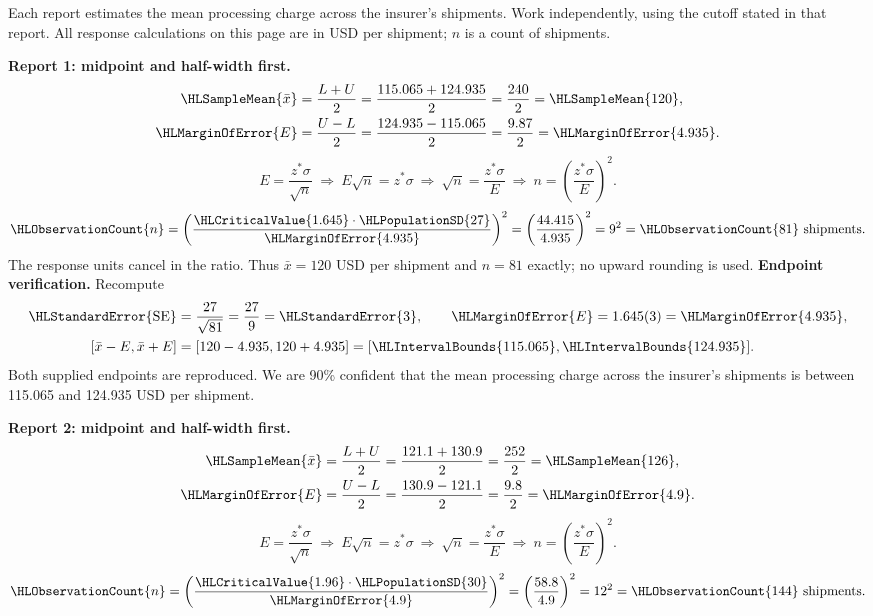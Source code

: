 Each report estimates the mean processing charge across the insurer's shipments. Work independently, using the cutoff stated in that report. All response calculations on this page are in USD per shipment; $n$ is a count of shipments.
\par\noindent\textbf{Report 1: midpoint and half-width first.}
\[\begin{aligned}
\HLSampleMean{\bar x}&=\frac{L+U}{2}=\frac{115.065+124.935}{2}=\frac{240}{2}=\HLSampleMean{120},\\
\HLMarginOfError{E}&=\frac{U-L}{2}=\frac{124.935-115.065}{2}=\frac{9.87}{2}=\HLMarginOfError{4.935}.
\end{aligned}\]
\[E=\frac{z^*\sigma}{\sqrt n}\ \Longrightarrow\ E\sqrt n=z^*\sigma\ \Longrightarrow\ \sqrt n=\frac{z^*\sigma}{E}\ \Longrightarrow\ n=\left(\frac{z^*\sigma}{E}\right)^2.\]
\[\HLObservationCount{n}=\left(\frac{\HLCriticalValue{1.645}\cdot\HLPopulationSD{27}}{\HLMarginOfError{4.935}}\right)^2=\left(\frac{44.415}{4.935}\right)^2=9^2=\HLObservationCount{81}\text{ shipments}.\]
The response units cancel in the ratio. Thus $\bar x=120$ USD per shipment and $n=81$ exactly; no upward rounding is used.
\textbf{Endpoint verification.} Recompute
\[\begin{aligned}
\HLStandardError{\mathrm{SE}}&=\frac{27}{\sqrt{81}}=\frac{27}{9}=\HLStandardError{3},\qquad \HLMarginOfError{E}=1.645(3)=\HLMarginOfError{4.935},\\
[\bar x-E,\bar x+E]&=[120-4.935,120+4.935]=[\HLIntervalBounds{115.065},\HLIntervalBounds{124.935}].
\end{aligned}\]
Both supplied endpoints are reproduced. We are 90\% confident that the mean processing charge across the insurer's shipments is between 115.065 and 124.935 USD per shipment.
\par\noindent\textbf{Report 2: midpoint and half-width first.}
\[\begin{aligned}
\HLSampleMean{\bar x}&=\frac{L+U}{2}=\frac{121.1+130.9}{2}=\frac{252}{2}=\HLSampleMean{126},\\
\HLMarginOfError{E}&=\frac{U-L}{2}=\frac{130.9-121.1}{2}=\frac{9.8}{2}=\HLMarginOfError{4.9}.
\end{aligned}\]
\[E=\frac{z^*\sigma}{\sqrt n}\ \Longrightarrow\ E\sqrt n=z^*\sigma\ \Longrightarrow\ \sqrt n=\frac{z^*\sigma}{E}\ \Longrightarrow\ n=\left(\frac{z^*\sigma}{E}\right)^2.\]
\[\HLObservationCount{n}=\left(\frac{\HLCriticalValue{1.96}\cdot\HLPopulationSD{30}}{\HLMarginOfError{4.9}}\right)^2=\left(\frac{58.8}{4.9}\right)^2=12^2=\HLObservationCount{144}\text{ shipments}.\]
